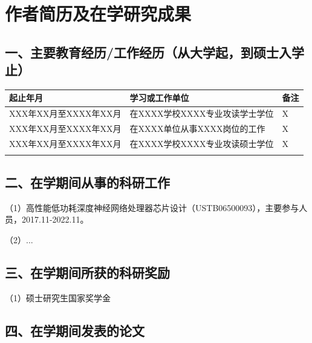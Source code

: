 \chapter*{作者简历及在学研究成果}

\section*{一、主要教育经历/工作经历（从大学起，到硕士入学止）}


\noindent\begin{tabularx}{\textwidth}{|>{\centering\arraybackslash}X|>{\centering\arraybackslash}X|>{\centering\arraybackslash}X|}
  \hline
  起止年月 & 学习或工作单位 & 备注 \\\hline 
  XXX年XX月至XXXX年XX月  & 在XXXX学校XXXX专业攻读学士学位  & X  \\\hline
  XXX年XX月至XXXX年XX月  & 在XXXX单位从事XXXX岗位的工作  & X  \\\hline
  XXX年XX月至XXXX年XX月  & 在XXXX学校XXXX专业攻读硕士学位  & X  \\\hline
  & & \\ \hline
\end{tabularx}

\section*{二、在学期间从事的科研工作}

（1）高性能低功耗深度神经网络处理器芯片设计（USTB06500093），主要参与人员，2017.11-2022.11。

（2）... 

\section*{三、在学期间所获的科研奖励}

（1）硕士研究生国家奖学金

\section*{四、在学期间发表的论文}

